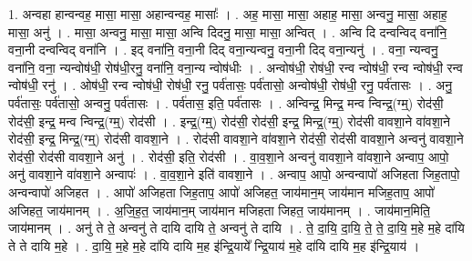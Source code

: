 \documentclass[17pt]{extarticle}
\begin{document}
1. अन्वहा हान्वन्वह॒ मासा॒ मासा॒ अहान्वन्वह॒ मासाः᳚ । . अह॒ मासा॒ मासा॒ अहाह॒ मासा॒ अन्वनु॒ मासा॒ अहाह॒ मासा॒ अनु॑ । . मासा॒ अन्वनु॒ मासा॒ मासा॒ अन्वि दिदनु॒ मासा॒ मासा॒ अन्वित् । . अन्वि दि दन्वन्विद् वना॑नि॒ वना॒नी दन्वन्विद् वना॑नि । . इद् वना॑नि॒ वना॒नी दिद् वना॒न्यन्वनु॒ वना॒नी दिद् वना॒न्यनु॑ । . वना॒ न्यन्वनु॒ वना॑नि॒ वना॒ न्यन्वोष॑धी॒ रोष॑धी॒रनु॒ वना॑नि॒ वना॒न्य न्वोष॑धीः । . अन्वोष॑धी॒ रोष॑धी॒ रन्व न्वोष॑धी॒ रन्व न्वोष॑धी॒ रन्व न्वोष॑धी॒ रनु॑ । . ओष॑धी॒ रन्व न्वोष॑धी॒ रोष॑धी॒ रनु॒ पर्व॑तासः॒ पर्व॑तासो॒ अन्वोष॑धी॒ रोष॑धी॒ रनु॒ पर्व॑तासः । . अनु॒ पर्व॑तासः॒ पर्व॑तासो॒ अन्वनु॒ पर्व॑तासः । . पर्व॑तास॒ इति॒ पर्व॑तासः । . अन्विन्द्र॒ मिन्द्र॒ मन्व न्विन्द्र॒(ग्म्॒) रोद॑सी॒ रोद॑सी॒ इन्द्र॒ मन्व न्विन्द्र॒(ग्म्॒) रोद॑सी । . इन्द्र॒(ग्म्॒) रोद॑सी॒ रोद॑सी॒ इन्द्र॒ मिन्द्र॒(ग्म्॒) रोद॑सी वावशा॒ने वा॑वशा॒ने रोद॑सी॒ इन्द्र॒ मिन्द्र॒(ग्म्॒) रोद॑सी वावशा॒ने । . रोद॑सी वावशा॒ने वा॑वशा॒ने रोद॑सी॒ रोद॑सी वावशा॒ने अन्वनु॑ वावशा॒ने रोद॑सी॒ रोद॑सी वावशा॒ने अनु॑ । . रोद॑सी॒ इति॒ रोद॑सी । . वा॒व॒शा॒ने अन्वनु॑ वावशा॒ने वा॑वशा॒ने अन्वाप॒ आपो॒ अनु॑ वावशा॒ने वा॑वशा॒ने अन्वापः॑ । . वा॒व॒शा॒ने इति॑ वावशा॒ने । . अन्वाप॒ आपो॒ अन्वन्वापो॑ अजिहता जिह॒तापो॒ अन्वन्वापो॑ अजिहत । . आपो॑ अजिहता जिह॒ताप॒ आपो॑ अजिहत॒ जाय॑मान॒म् जाय॑मान मजिह॒ताप॒ आपो॑ अजिहत॒ जाय॑मानम् । . अ॒जि॒ह॒त॒ जाय॑मान॒म् जाय॑मान मजिहता जिहत॒ जाय॑मानम् । . जाय॑मान॒मिति॒ जाय॑मानम् । . अनु॑ ते ते॒ अन्वनु॑ ते दायि दायि ते॒ अन्वनु॑ ते दायि । . ते॒ दा॒यि॒ दा॒यि॒ ते॒ ते॒ दा॒यि॒ म॒हे म॒हे दा॑यि ते ते दायि म॒हे । . दा॒यि॒ म॒हे म॒हे दा॑यि दायि म॒ह इ॑न्द्रि॒याये᳚ न्द्रि॒याय॑ म॒हे दा॑यि दायि म॒ह इ॑न्द्रि॒याय॑ । \newline
\end{document}
